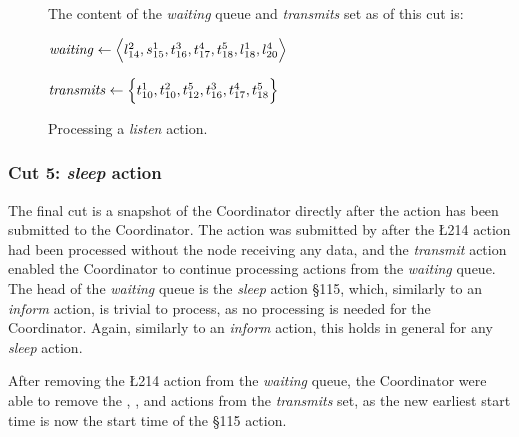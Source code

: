 \begin{figure}[H]
    \caption{Processing a \textit{listen} action.}\label{tikz:coordinatormsc4}
     \par

    \begin{minipage}[h]{14.5cm}
        The content of the \textit{waiting} queue and \textit{transmits} set as of this cut is: \smallbreak

        $\mathit{waiting} \leftarrow \Big\langle l^{2}_{14}, s^{1}_{15}, t^{3}_{16}, t^{4}_{17}, t^{5}_{18},
            l^{1}_{18}, l^{4}_{20} \Big\rangle$

        $\mathit{transmits} \leftarrow \Big\{ t^{1}_{10}, t^{2}_{10}, t^{5}_{12}, t^{3}_{16}, t^{4}_{17}, t^{5}_{18}
            \Big\}$
    \end{minipage}
\end{figure}

\subsubsection{Cut 5: \textit{sleep} action}
The final cut is a snapshot of the Coordinator directly after the  action has been submitted to the
Coordinator. The  action was submitted by  after the \L{2}{14} action had been processed
without the node receiving any data, and the \textit{transmit} action enabled the Coordinator to continue
processing actions from the \textit{waiting} queue. The head of the \textit{waiting} queue is the
\textit{sleep} action \S{1}{15}, which, similarly to an \textit{inform} action, is trivial to process, as no
processing is needed for the Coordinator. Again, similarly to an \textit{inform} action, this holds in general
for any \textit{sleep} action. \smallbreak

After removing the \L{2}{14} action from the \textit{waiting} queue, the Coordinator were able to remove the
, , and  actions from the \textit{transmits} set, as the new earliest start time is
now the start time of the \S{1}{15} action.

